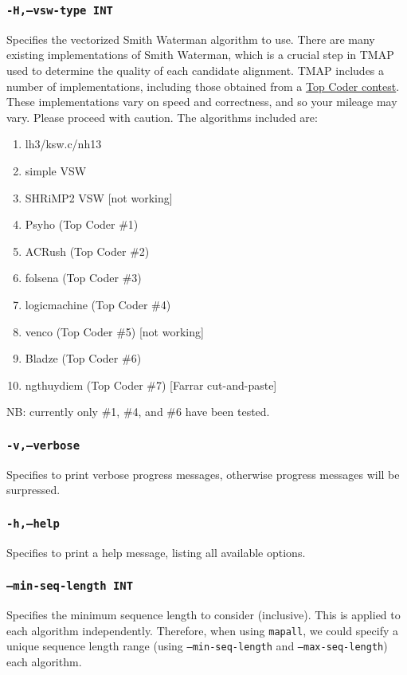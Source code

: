 \documentclass[a4paper,12pt]{book}
\newcommand{\TT}[1]{{\tt #1}} %
\begin{document}
\subsubsection{\TT{-H,--vsw-type INT}}
Specifies the vectorized Smith Waterman algorithm to use.
There are many existing implementations of Smith Waterman, which is a crucial step in TMAP used to determine the quality of each candidate alignment.
TMAP includes a number of implementations, including those obtained from a  \href{http://community.topcoder.com/longcontest/?module=ViewProblemStatement&rd=15078&pm=11786}{Top Coder contest}.
These implementations vary on speed and correctness, and so your mileage may vary.  
Please proceed with caution. 
The algorithms included are:
\begin{enumerate}
\item lh3/ksw.c/nh13
\item simple VSW
\item SHRiMP2 VSW [not working]
\item Psyho (Top Coder \#1)
\item ACRush (Top Coder \#2)
\item folsena (Top Coder \#3)
\item logicmachine (Top Coder \#4)
\item venco (Top Coder \#5) [not working]
\item Bladze (Top Coder \#6)
\item ngthuydiem (Top Coder \#7) [Farrar cut-and-paste]
\end{enumerate}
NB: currently only \#1, \#4, and \#6 have been tested.
\subsubsection{\TT{-v,--verbose}}
Specifies to print verbose progress messages, otherwise progress messages will be surpressed.

\subsubsection{\TT{-h,--help}}
Specifies to print a help message, listing all available options.

\subsubsection{\TT{--min-seq-length INT}}
Specifies the minimum sequence length to consider (inclusive).
This is applied to each algorithm independently.
Therefore, when using \TT{mapall}, we could specify a unique sequence length range (using \TT{---min-seq-length} and \TT{---max-seq-length}) each algorithm.
\end{document}
